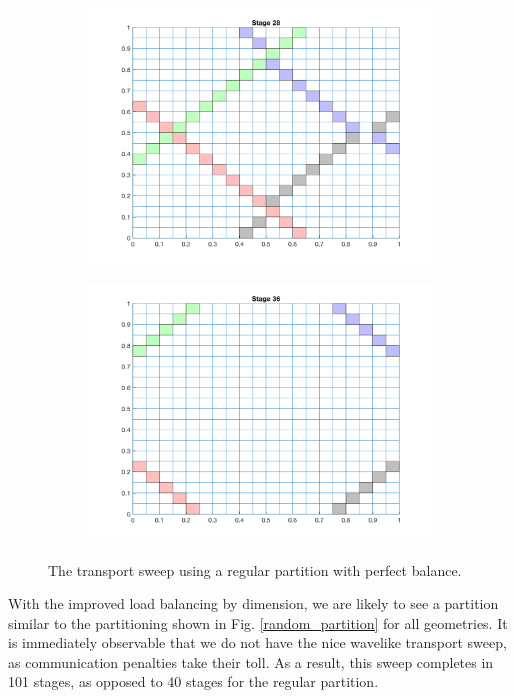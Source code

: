\documentclass[11pt, letterpaper,titlepage,oneside]{article}
\begin{document}
\begin{figure}[H]
\begin{subfigure}{0.49\textwidth}
  \includegraphics[scale=0.5]{../figures/regular_partition_3.png}
  \end{subfigure}
  \begin{subfigure}{0.49\textwidth}
  \includegraphics[scale=0.5]{../figures/regular_partition_4.png}
  \end{subfigure}
  \caption{The transport sweep using a regular partition with perfect balance.}
  \label{regular_partition}
\end{figure}

With the improved load balancing by dimension, we are likely to see a partition similar to the partitioning shown in Fig. \ref{random_partition} for all geometries. It is immediately observable that we do not have the nice wavelike transport sweep, as communication penalties take their toll. As a result, this sweep completes in 101 stages, as opposed to 40 stages for the regular partition.
\end{document}
